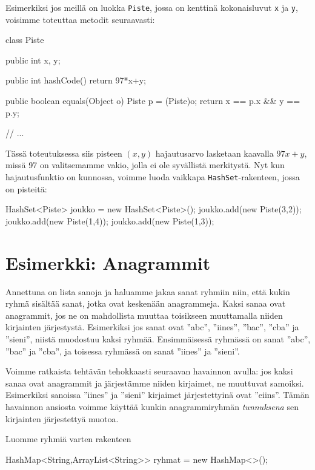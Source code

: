 Esimerkiksi jos meillä on luokka \texttt{Piste},
jossa on kenttinä kokonaisluvut \texttt{x} ja \texttt{y},
voisimme toteuttaa metodit seuraavasti:

\begin{code}
class Piste {
    public int x, y;

    public int hashCode() {
        return 97*x+y;
    }
    
    public boolean equals(Object o) {
        Piste p = (Piste)o;
        return x == p.x && y == p.y;
    }

    // ...
}
\end{code}

Tässä toteutuksessa siis pisteen $(x,y)$ hajautusarvo lasketaan
kaavalla $97x+y$, missä 97 on valitsemamme vakio, jolla ei ole
syvällistä merkitystä.
Nyt kun hajautusfunktio on kunnossa,
voimme luoda vaikkapa \texttt{HashSet}-rakenteen, jossa on pisteitä:

\begin{code}
HashSet<Piste> joukko = new HashSet<Piste>();
joukko.add(new Piste(3,2));
joukko.add(new Piste(1,4));
joukko.add(new Piste(1,3));
\end{code}

\section{Esimerkki: Anagrammit}

Annettuna on lista sanoja ja haluamme jakaa sanat ryhmiin niin,
että kukin ryhmä sisältää sanat, jotka ovat keskenään anagrammeja.
Kaksi sanaa ovat anagrammit, jos ne on mahdollista muuttaa toisikseen
muuttamalla niiden kirjainten järjestystä.
Esimerkiksi jos sanat ovat ''abc'', ''iines'', ''bac'', ''cba'' ja ''sieni'',
niistä muodostuu kaksi ryhmää.
Ensimmäisessä ryhmässä on sanat ''abc'', ''bac'' ja ''cba'',
ja toisessa ryhmässä on sanat ''iines'' ja ''sieni''.

Voimme ratkaista tehtävän tehokkaasti seuraavan havainnon avulla:
jos kaksi sanaa ovat anagrammit ja järjestämme niiden kirjaimet,
ne muuttuvat samoiksi.
Esimerkiksi sanoissa ''iines'' ja ''sieni'' kirjaimet
järjestettyinä ovat ''eiins''.
Tämän havainnon ansiosta voimme käyttää kunkin anagrammiryhmän
\emph{tunnuksena} sen kirjainten järjestettyä muotoa.

Luomme ryhmiä varten rakenteen

\begin{code}
HashMap<String,ArrayList<String>> ryhmat = new HashMap<>();
\end{code}

